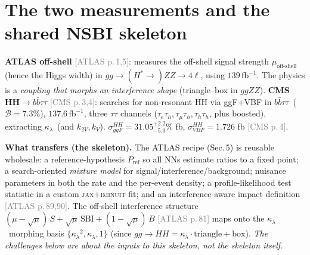 \documentclass[11pt]{article}
\newcommand{\kl}{\ensuremath{\kappa_\lambda}}
\newcommand{\bbtt}{\ensuremath{b\bar b\tau\tau}}
\newcommand{\pA}[1]{\textcolor{gray}{\small[ATLAS p.\,#1]}}
\newcommand{\pC}[1]{\textcolor{gray}{\small[CMS p.\,#1]}}
\begin{document}
\section{The two measurements and the shared NSBI skeleton}
\textbf{ATLAS off-shell} \pA{1,5}: measures the off-shell signal strength $\mu_{\text{off-shell}}$ (hence the Higgs
width) in $gg\to(H^*\to)ZZ\to4\ell$, using $139\,\mathrm{fb}^{-1}$. The physics is a \emph{coupling that morphs an
interference shape} (triangle--box in $ggZZ$). \textbf{CMS HH$\to\bbtt$} \pC{3,4}: searches for non-resonant HH via
ggF+VBF in \bbtt\ ($\mathcal B=7.3\%$), $137.6\,\mathrm{fb}^{-1}$, three $\tau\tau$ channels
($\tau_e\tau_h,\tau_\mu\tau_h,\tau_h\tau_h$, plus boosted), extracting \kl\ (and $k_{2V},k_V$). $\sigma_{ggF}^{HH}=
31.05^{+2.2}_{-5.0}\%$ fb, $\sigma_{VBF}^{HH}=1.726$ fb \pC{4}.

\noindent\textbf{What transfers (the skeleton).} The ATLAS recipe (Sec.\,5) is reusable wholesale: a
reference-hypothesis $P_{\mathrm{ref}}$ so all NNs estimate ratios to a fixed point; a search-oriented
\emph{mixture model} for signal/interference/background; nuisance parameters in both the rate and the per-event
density; a profile-likelihood test statistic in a custom \textsc{jax}+\textsc{iminuit} fit; and an
interference-aware impact definition \pA{89,90}. The off-shell interference structure
$(\mu-\sqrt\mu)\,S+\sqrt\mu\,\mathrm{SBI}+(1-\sqrt\mu)\,B$ \pA{81} maps onto the \kl\ morphing basis
$\{\kl^2,\kl,1\}$ (since $gg\to HH=\kl\cdot\mathrm{triangle}+\mathrm{box}$). \emph{The challenges below are about the
inputs to this skeleton, not the skeleton itself.}
\end{document}
